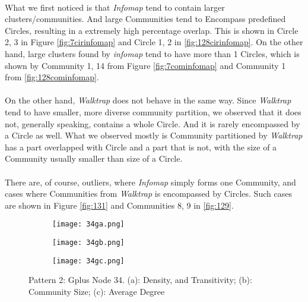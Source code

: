 \paragraph{}
What we first noticed is that \textit{Infomap} tend to contain larger clusters/communities. And large Communities tend to Encompass predefined Circles, resulting in a extremely high percentage overlap. This is shown in Circle 2, 3 in Figure \ref{fig:7cirinfomap} and Circle 1, 2 in  \ref{fig:128cirinfomap}. On the other hand, large clusters found by \textit{infomap} tend to have more than 1 Circles, which is shown by Community 1, 14 from Figure \ref{fig:7cominfomap} and Community 1 from \ref{fig:128cominfomap}.
\paragraph{}
On the other hand, \textit{Walktrap} does not behave in the same way. Since \textit{Walktrap} tend to have smaller, more diverse community partition, we observed that it does not, generally speaking, contains a whole Circle. And it is rarely encompassed by a Circle as well. What we observed mostly is Community partitioned by \textit{Walktrap} has a part overlapped with Circle and a part that is not, with the size of a Community usually smaller than size of a Circle.
\paragraph{}
There are, of course, outliers, where \textit{Infomap} simply forms one Community, and cases where Communities from \textit{Walktrap} is encompassed by Circles. Such cases are shown in Figure \ref{fig:131} and Communities 8, 9 in \ref{fig:129}.
\begin{figure}[h]
	\centering
	\begin{subfigure}{.5\textwidth}
		\centering
		\texttt{[image: 34ga.png]}
		\caption{}		
		\label{fig:34ga}
	\end{subfigure}%
	\begin{subfigure}{.5\textwidth}
		\centering
		\texttt{[image: 34gb.png]}
		\caption{}	
		\label{fig:34b}
	\end{subfigure}
	\begin{subfigure}{.5\textwidth}
		\centering
		\texttt{[image: 34gc.png]}
		\caption{}	
		\label{fig:34gc}
	\end{subfigure}
	\caption{Pattern 2: Gplus Node 34. (a): Density, and Transitivity; (b): Community Size; (c): Average Degree}
	\label{fig:34g}
\end{figure}


